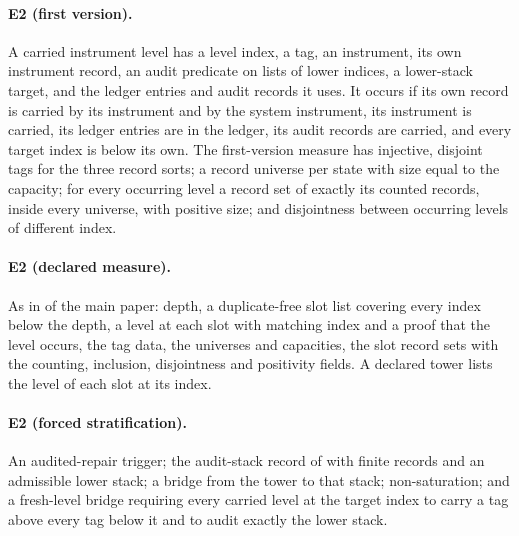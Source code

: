 \paragraph{E2 (first version).} A carried instrument level has a level index, a tag, an instrument,
its own instrument record, an audit predicate on lists of lower indices, a lower-stack target, and the
ledger entries and audit records it uses. It occurs if its own record is carried by its instrument and
by the system instrument, its instrument is carried, its ledger entries are in the ledger, its audit
records are carried, and every target index is below its own. The first-version measure has injective,
disjoint tags for the three record sorts; a record universe per state with size equal to the capacity;
for every occurring level a record set of exactly its counted records, inside every universe, with
positive size; and disjointness between occurring levels of different index.

\paragraph{E2 (declared measure).} As in  of the main paper: depth, a
duplicate-free slot list covering every index below the depth, a level at each slot with matching
index and a proof that the level occurs, the tag data, the universes and capacities, the slot record sets with
the counting, inclusion, disjointness and positivity fields. A declared tower lists the level of each
slot at its index.

\paragraph{E2 (forced stratification).} An audited-repair trigger; the audit-stack record of
\FoundIII{} with finite records and an admissible lower stack; a bridge from the tower to that stack;
non-saturation; and a fresh-level bridge requiring every carried level at the target index to carry a
tag above every tag below it and to audit exactly the lower stack.

